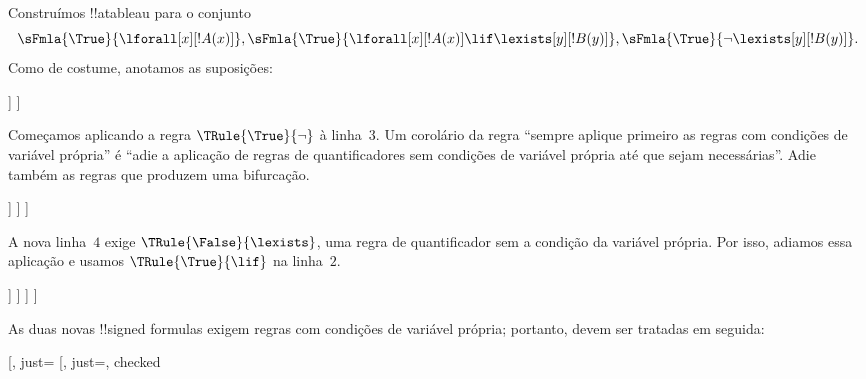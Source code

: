 \documentclass[../../../include/open-logic-section]{subfiles}
\begin{document}
\begin{ex}
Construímos !!a{tableau} para o conjunto
\[
\sFmla{\True}{\lforall[x][!A(x)]}, \sFmla{\True}{\lforall[x][!A(x)] 
  \lif \lexists[y][!B(y)]}, \sFmla{\True}{\lnot\lexists[y][!B(y)]}.
\]
Como de costume, anotamos as suposições:
\begin{oltableau}
  [\sFmla{\True}{\lforall[x][\formula{A}(x)]}, just=\TAss
    [\sFmla{\True}{\lforall[x][\formula{A}(x)] \lif
        \lexists[y][\formula{B}(y)]}, just=\TAss
      [\sFmla{\True}{\lnot\lexists[y][\formula{B}(y)]}, just=\TAss
      ]
    ]
  ]
\end{oltableau}
Começamos aplicando a regra $\TRule{\True}{\lnot}$ à linha~$3$. Um
corolário da regra ``sempre aplique primeiro as regras com condições de
variável própria'' é ``adie a aplicação de regras de quantificadores sem
condições de variável própria até que sejam necessárias''. Adie também as
regras que produzem uma bifurcação.
\begin{oltableau}
  [\sFmla{\True}{\lforall[x][\formula{A}(x)]}, just=\TAss
    [\sFmla{\True}{\lforall[x][\formula{A}(x)] \lif
        \lexists[y][\formula{B}(y)]}, just=\TAss
      [\sFmla{\True}{\lnot\lexists[y][\formula{B}(y)]}, just=\TAss, checked
        [\sFmla{\False}{\lexists[y][\formula{B}(y)]}, just={\TRule{\True}{\lnot}[3]}]
      ]
    ]
  ]
\end{oltableau}
A nova linha~$4$ exige $\TRule{\False}{\lexists}$, uma regra de
quantificador sem a condição da variável própria. Por isso, adiamos essa
aplicação e usamos $\TRule{\True}{\lif}$ na linha~$2$.
\begin{oltableau}
  [\sFmla{\True}{\lforall[x][\formula{A}(x)]}, just=\TAss
    [\sFmla{\True}{\lforall[x][\formula{A}(x)] \lif
        \lexists[y][\formula{B}(y)]}, just=\TAss, checked
      [\sFmla{\True}{\lnot\lexists[y][\formula{B}(y)]}, just=\TAss, checked
        [\sFmla{\False}{\lexists[y][\formula{B}(y)]},
          just={\TRule{\True}{\lnot}[3]},
          [\sFmla{\False}{\lforall[x][\formula{A}(x)]}, just={\TRule{\True}{\lif}[2]}]
          [\sFmla{\True}{\lexists[y][\formula{B}(y)]}, just={\TRule{\True}{\lif}[2]}]
        ]
      ]
    ]
  ]
\end{oltableau}
As duas novas !!{signed formula}s exigem regras com condições de variável própria;
portanto, devem ser tratadas em seguida:
\begin{oltableau}
  [\sFmla{\True}{\lforall[x][\formula{A}(x)]}, just=\TAss
    [\sFmla{\True}{\lforall[x][\formula{A}(x)] \lif
        \lexists[y][\formula{B}(y)]}, just=\TAss, checked

\end{oltableau}
\end{ex}
\end{document}

